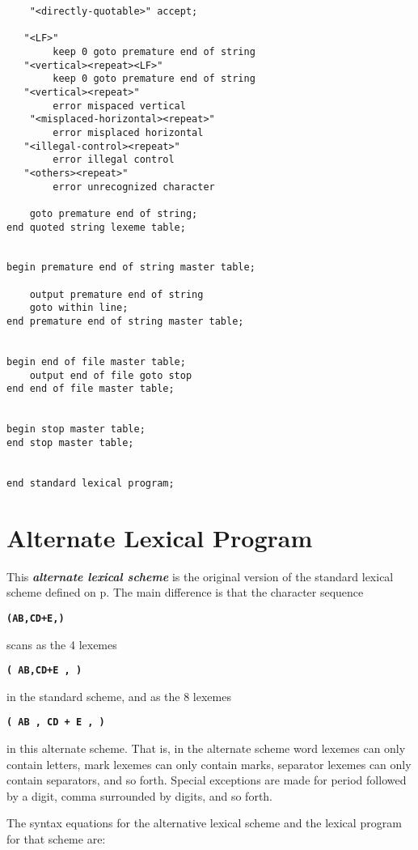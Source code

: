 \documentclass[12pt]{article}
\newcommand{\TT}[1]{{\tt \bfseries #1}}
\newcommand{\key}[1]{{\bf \em #1}\index{#1}}
\newcommand{\pagref}[1]{p\pageref{#1}}
\newenvironment{indpar}[1][0.3in]%
	{\begin{list}{}%
		     {\setlength{\itemsep}{0in}%
		      \setlength{\topsep}{0in}%
		      \setlength{\parsep}{1ex}%
		      \setlength{\labelwidth}{#1}%
		      \setlength{\leftmargin}{#1}%
		      \addtolength{\leftmargin}{\labelsep}}%
	 \item}%
	{\end{list}}
\begin{document}
\begin{indpar}
\begin{verbatim}
    "<directly-quotable>" accept;

   "<LF>"
        keep 0 goto premature end of string
   "<vertical><repeat><LF>"
        keep 0 goto premature end of string
   "<vertical><repeat>"
        error mispaced vertical
    "<misplaced-horizontal><repeat>"
        error misplaced horizontal
   "<illegal-control><repeat>"
        error illegal control
   "<others><repeat>"
        error unrecognized character

    goto premature end of string;
end quoted string lexeme table;


begin premature end of string master table;

    output premature end of string
    goto within line;
end premature end of string master table;


begin end of file master table;
    output end of file goto stop
end end of file master table;


begin stop master table;
end stop master table;


end standard lexical program;
\end{verbatim}
\end{indpar}

\newpage

\section{Alternate Lexical Program}
\label{ALTERNATE-LEXICAL-PROGRAM}

This \key{alternate lexical scheme} is the original version
of the standard lexical scheme defined on
\pagref{LEXEME-PROGRAM-LEXEMES}.  The main difference is
that the character sequence
\begin{center}
\TT{(AB,CD+E,)}
\end{center}
scans as the 4 lexemes
\begin{center}
\TT{( AB,CD+E , )}
\end{center}
in the standard scheme, and as the 8 lexemes
\begin{center}
\TT{( AB , CD + E , )}
\end{center}
in this alternate scheme.  That is, in the alternate scheme
word lexemes can only contain letters, mark lexemes can only
contain marks, separator lexemes can only contain separators,
and so forth.  Special exceptions are made for period followed
by a digit, comma surrounded by digits, and so forth.

The syntax equations for the alternative lexical scheme and
the lexical program for that scheme are:
\end{document}
